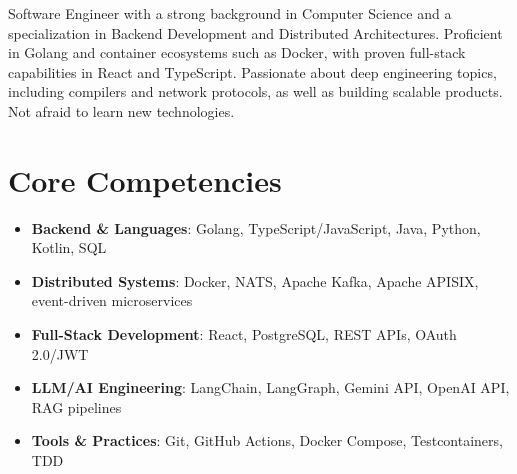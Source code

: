 \documentclass[11pt,a4paper,sans]{moderncv}
\begin{document}
\makecvtitle


\vspace{6pt}
\small{Software Engineer with a strong background in Computer Science and a specialization in Backend Development and Distributed Architectures. Proficient in Golang and container ecosystems such as Docker, with proven full-stack capabilities in React and TypeScript. Passionate about deep engineering topics, including compilers and network protocols, as well as building scalable products. Not afraid to learn new technologies.}


\section{Core Competencies}
\vspace{1pt}
\begin{itemize}

\item \textbf{Backend \& Languages}: Golang, TypeScript/JavaScript, Java, Python, Kotlin, SQL

\item \textbf{Distributed Systems}: Docker, NATS, Apache Kafka, Apache APISIX, event-driven microservices

\item \textbf{Full-Stack Development}: React, PostgreSQL, REST APIs, OAuth 2.0/JWT

\item \textbf{LLM/AI Engineering}: LangChain, LangGraph, Gemini API, OpenAI API, RAG pipelines

\item \textbf{Tools \& Practices}: Git, GitHub Actions, Docker Compose, Testcontainers, TDD

\end{itemize}

\end{document}
